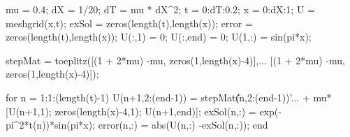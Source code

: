 mu = 0.4;
dX = 1/20;
dT = mu * dX^2;
t = 0:dT:0.2;
x = 0:dX:1;
U = meshgrid(x,t);
exSol = zeros(length(t),length(x));
error = zeros(length(t),length(x));
U(:,1) = 0;
U(:,end) = 0;
U(1,:) = sin(pi*x);

stepMat = toeplitz([(1 + 2*mu) -mu, zeros(1,length(x)-4)],...
             [(1 + 2*mu) -mu, zeros(1,length(x)-4)]);

for n = 1:1:(length(t)-1)
    U(n+1,2:(end-1)) = stepMat\U(n,2:(end-1))'...
                       + mu*[U(n+1,1); zeros(length(x)-4,1); U(n+1,end)];
    exSol(n,:) = exp(-pi^2*t(n))*sin(pi*x);
    error(n,:) = abs(U(n,:) -exSol(n,:)); 
end
